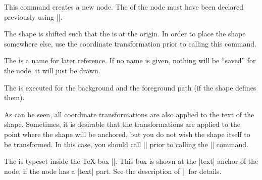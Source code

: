 \begin{command}{\pgfnode{}}
    This command creates a new node. The  of the node must have
    been declared previously using |\pgfdeclareshape|.

    The shape is shifted such that the  is at the origin. In order
    to place the shape somewhere else, use the coordinate transformation prior
    to calling this command.

    The  is a name for later reference. If no name is given, nothing
    will be ``saved'' for the node, it will just be drawn.

    The  is executed for the background and the
    foreground path (if the shape defines them).
\begin{codeexample}[]
\end{codeexample}

    As can be seen, all coordinate transformations are also applied to the text
    of the shape. Sometimes, it is desirable that the transformations are
    applied to the point where the shape will be anchored, but you do not wish
    the shape itself to be transformed. In this case, you should call
    |\pgftransformresetnontranslations| prior to calling the |\pgfnode|
    command.
\begin{codeexample}[]
\end{codeexample}

    The  is typeset inside the \TeX-box |\pgfnodeparttextbox|.
    This box is shown at the |text| anchor of the node, if the node has a
    |text| part. See the description of |\pgfmultipartnode| for details.
\end{command}


